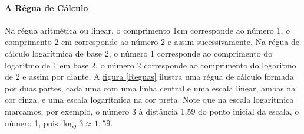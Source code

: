 \paragraph{A Régua de Cálculo}

Na régua aritmética ou linear, o comprimento 1cm corresponde ao número 1, o comprimento 2 cm corresponde ao número 2 e assim sucessivamente. Na régua de cálculo logarítmica de base 2, o número 1 corresponde ao comprimento do logaritmo de 1 em base 2, o número 2 corresponde ao comprimento do logaritmo de 2 e assim por diante. A \hyperref[Reguas]{figura \ref{Reguas}}
ilustra uma régua de cálculo formada por duas partes, cada uma com uma linha central e uma escala linear, ambas na cor 
cinza, e uma escala logarítmica na cor preta. Note que na escala logarítmica marcamos, por exemplo, o número 3 à distância 1,59 do 
ponto inicial da escala, o número 1, pois $\log_2 3 \approx 1{,}59$.

